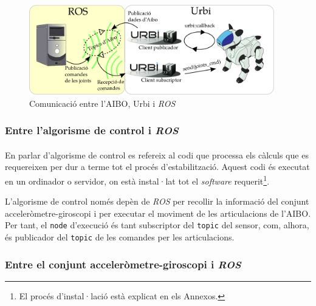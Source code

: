 \documentclass[12pt,a4paper,final,twoside]{article}
\begin{document}
\begin{figure}[tb]
\centering
\includegraphics[width=0.95\textwidth]{Imatges/Comunicacio-ROS-Urbi-Aibo.pdf}
\caption{Comunicació entre l'AIBO, Urbi i \textit{ROS}}
\label{fig:Comunicacio-ROS-Urbi-AIBO}
\end{figure}


\subsubsection{Entre l'algorisme de control i \textit{ROS}}

\paragraph{}En parlar d'algorisme de control es refereix al codi que processa els càlculs que es requereixen per dur a terme tot el procés d'estabilització. Aquest codi és executat en un ordinador o servidor, on està instal·lat tot el \textit{software} requerit\footnote{El procés d'instal·lació està explicat en els Annexos.}. 

L'algorisme de control només depèn de \textit{ROS} per recollir la informació del conjunt acceleròmetre-giroscopi i per executar el moviment de les articulacions de l'AIBO. Per tant, el \texttt{node} d'execució és tant subscriptor del \texttt{topic} del sensor, com, alhora, és publicador del \texttt{topic} de les comandes per les articulacions.


\subsubsection{Entre el conjunt acceleròmetre-giroscopi i \textit{ROS}}

\end{document}
